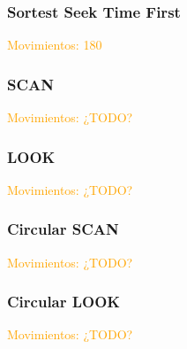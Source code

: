 \begin{frame}
  \frametitle{\textbf{Sortest Seek Time First}}
  \hspace{35pt} \textcolor{orange}{Movimientos: 180}
\end{frame}

\begin{frame}
  \frametitle{\textbf{SCAN}}
  \hspace{35pt} \textcolor{orange}{Movimientos: ¿TODO?}
\end{frame}

\begin{frame}
  \frametitle{\textbf{LOOK}}
  \hspace{35pt} \textcolor{orange}{Movimientos: ¿TODO?}
\end{frame}

\begin{frame}
  \frametitle{\textbf{Circular SCAN}}
  \hspace{35pt} \textcolor{orange}{Movimientos: ¿TODO?}
\end{frame}

\begin{frame}
  \frametitle{\textbf{Circular LOOK}}
  \hspace{35pt} \textcolor{orange}{Movimientos: ¿TODO?}
\end{frame}


